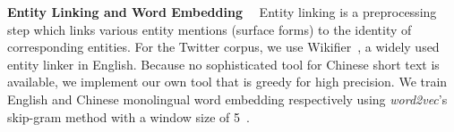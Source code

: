 \textbf{Entity Linking and Word Embedding}~~
Entity linking is a preprocessing step which links various entity mentions (surface forms) to the identity of corresponding entities.
For the Twitter corpus, we use Wikifier~\cite{ratinov2011local,cheng2013relational}, a widely used
entity linker in English. 
Because no sophisticated tool for Chinese short text is available, 
we implement our own tool that is greedy for high precision.
%
%
We train English and Chinese monolingual word embedding respectively using \textit{word2vec}’s skip-gram method with a window size of 5~\cite{Mikolov2013distributed}.

